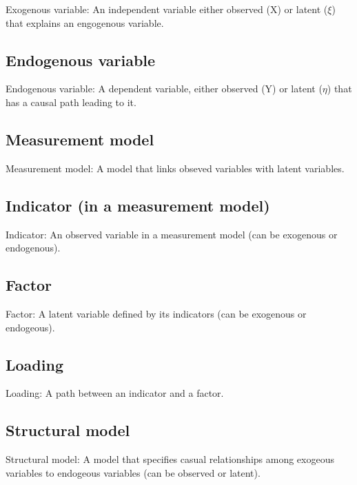\documentclass[]{book}
\begin{document}
Exogenous variable: An independent variable either observed (X) or latent (\(\xi\)) that explains an engogenous variable.

\hypertarget{endogenous-variable}{%
\subsection{Endogenous variable}\label{endogenous-variable}}

Endogenous variable: A dependent variable, either observed (Y) or latent (\(\eta\)) that has a causal path leading to it.

\hypertarget{measurement-model}{%
\subsection{Measurement model}\label{measurement-model}}

Measurement model: A model that links obseved variables with latent variables.

\hypertarget{indicator-in-a-measurement-model}{%
\subsection{Indicator (in a measurement model)}\label{indicator-in-a-measurement-model}}

Indicator: An observed variable in a measurement model (can be exogenous or endogenous).

\hypertarget{factor}{%
\subsection{Factor}\label{factor}}

Factor: A latent variable defined by its indicators (can be exogenous or endogeous).

\hypertarget{loading}{%
\subsection{Loading}\label{loading}}

Loading: A path between an indicator and a factor.

\hypertarget{structural-model}{%
\subsection{Structural model}\label{structural-model}}

Structural model: A model that specifies casual relationships among exogeous variables to endogeous variables (can be observed or latent).
\end{document}
